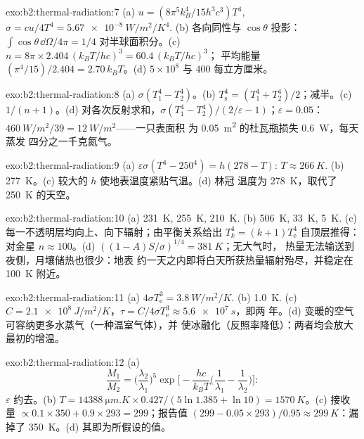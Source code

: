 \begin{solution}{exo:b2:thermal-radiation:7}
(a) $u = (8\pi^5k_B^4/15h^3c^3)T^4$, $\sigma = cu/4T^4 = \qty{5.67e-8}{W/m^2/K^4}$.
(b) 各向同性与 $\cos\theta$ 投影：$\int\cos\theta\,\dd\Omega/4\pi = 1/4$
对半球面积分。(c) $n = 8\pi \times 2.404\,(k_BT/hc)^3 = 60.4\,(k_BT/hc)^3$；
平均能量 $(\pi^4/15)/2.404 = 2.70\,k_BT$。(d) $5 \times 10^8$ 与 $400$
每立方厘米。
\end{solution}

\begin{solution}{exo:b2:thermal-radiation:8}
(a) $\sigma(T_1^4 - T_2^4)$。(b) $T_{\text{s}}^4 = (T_1^4 + T_2^4)/2$；减半。(c)
$1/(n + 1)$。(d) 对各次反射求和，$\sigma(T_1^4 - T_2^4)/(2/\varepsilon -
1)$；$\varepsilon = 0.05$：$\qty{460}{W/m^2}/39 = \qty{12}{W/m^2}$——一只表面积
为 \qty{0.05}{m^2} 的杜瓦瓶损失 \qty{0.6}{W}，每天蒸发
四分之一千克氮气。
\end{solution}

\begin{solution}{exo:b2:thermal-radiation:9}
(a) $\varepsilon\sigma(T^4 - 250^4) = h(278 - T)$: $T \approx \qty{266}{K}$. (b)
\qty{277}{K}。(c) 较大的 $h$ 使地表温度紧贴气温。(d) 林冠
温度为 \qty{278}{K}，取代了 \qty{250}{K} 的天空。
\end{solution}

\begin{solution}{exo:b2:thermal-radiation:10}
(a) \qty{231}{K}, \qty{255}{K}, \qty{210}{K}. (b) \qty{506}{K}, \qty{33}{K}, \qty{5}{K}.
(c) 每一不透明层均向上、向下辐射；由平衡关系给出
$T_k^4 = (k + 1)T_{\text{e}}^4$ 自顶层推得：对金星 $n \approx 100$。(d)
$((1 - A)S/\sigma)^{1/4} = \qty{381}{K}$；无大气时，
热量无法输送到夜侧，月壤储热也很少：地表
约一天之内即将白天所获热量辐射殆尽，并稳定在
\qty{100}{K} 附近。
\end{solution}

\begin{solution}{exo:b2:thermal-radiation:11}
(a) $4\sigma T_{\text{e}}^3 = \qty{3.8}{W/m^2/K}$. (b) \qty{1.0}{K}. (c) $C =
\qty{2.1e8}{J/m^2/K}$，$\tau = C/4\sigma T_{\text{e}}^3 \approx \qty{5.6e7}{s}$，即两
年。(d) 变暖的空气可容纳更多水蒸气（一种温室气体），并
使冰融化（反照率降低）：两者均会放大最初的增温。
\end{solution}

\begin{solution}{exo:b2:thermal-radiation:12}
(a)
\[
\frac{M_1}{M_2} = \Big(\frac{\lambda_2}{\lambda_1}\Big)^5\exp\Big[-\frac{hc}{k_BT}\Big(\frac{1}{\lambda_1} - \frac{1}{\lambda_2}\Big)\Big] :
\]
$\varepsilon$ 约去。(b) $T = \qty{14388}{\micro m.K} \times 0.427/(5\ln 1.385 +
\ln 10) = \qty{1570}{K}$。(c) 接收量 $\propto 0.1 \times 350 + 0.9 \times 293 =
299$；报告值 $(299 - 0.05 \times 293)/0.95 \approx \qty{299}{K}$：漏掉了
\qty{350}{K}。(d) 其即为所假设的值。
\end{solution}

